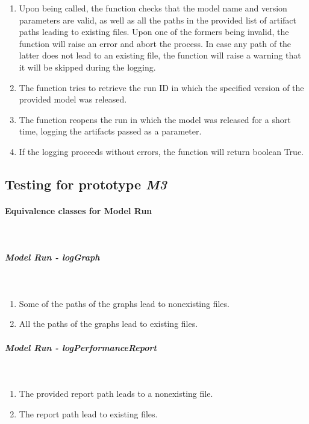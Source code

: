 \begin{enumerate}
    \item Upon being called, the function checks that the model name and version parameters are valid, as well as all the paths in the provided list of artifact paths 
    leading to existing files. Upon one of the formers being invalid, the function will raise an error and abort the process. In case any path of the latter
    does not lead to an existing file, the function will raise a warning that it will be skipped during the logging.

    \item The function tries to retrieve the run ID in which the specified version of the provided model was released.

    \item The function reopens the run in which the model was released for a short time, logging the artifacts passed as a parameter.
    
    \item If the logging proceeds without errors, the function will return boolean True.
\end{enumerate}


\subsection{Testing for prototype \emph{M3}}

\paragraph{Equivalence classes for Model Run} \mbox{}\\

\subparagraph{Model Run - logGraph} \mbox{}\\

\begin{enumerate}
    \item Some of the paths of the graphs lead to nonexisting files.
    \item All the paths of the graphs lead to existing files.
\end{enumerate}

\subparagraph{Model Run - logPerformanceReport} \mbox{}\\

\begin{enumerate}
    \item The provided report path leads to a nonexisting file.
    \item The report path lead to existing files.
\end{enumerate}

